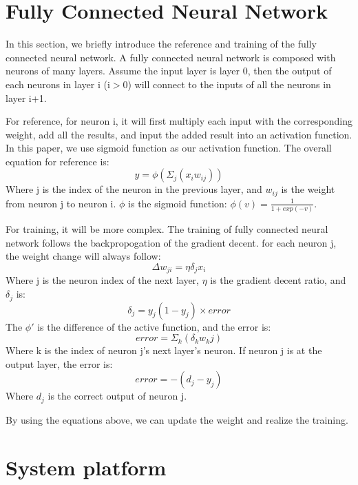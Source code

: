 \documentclass[conference]{IEEEtran}
\begin{document}
\section{Fully Connected Neural Network}
\label{sec:nn}
In this section, we briefly introduce the reference and training of the fully connected neural network. A fully connected neural network is composed with neurons of many layers. Assume the input layer is layer 0, then the output of each neurons in layer i (i$>$0) will connect to the inputs of all the neurons in layer i+1. 

For reference, for neuron i, it will first multiply each input with the corresponding weight, add all the results, and input the added result into an activation function. In this paper, we use sigmoid function as our activation function. The overall equation for reference is: 
\begin{equation}
y=\phi(\Sigma_{j}(x_i w_{ij}))
\end{equation}
Where j is the index of the neuron in the previous layer, and $w_{ij}$ is the weight from neuron j to neuron i. $\phi$ is the sigmoid function: $\phi(v)=\frac{1}{1+exp(-v)}$.

For training, it will be more complex. The training of fully connected neural network follows the backpropogation of the gradient decent. for each neuron j, the weight change will always follow:
\begin{equation}
\Delta w_{ji}=\eta \delta _j x_i
\end{equation}
Where j is the neuron index of the next layer, $\eta$ is the gradient decent ratio, and $\delta _j$ is:
\begin{equation}
\delta _j= y_j(1-y_j) \times error
\label{equ:delta}
\end{equation}
The $\phi \prime$ is the difference of the active function, and the error is:
\begin{equation}
error=\Sigma_{k}(\delta _k w_k j)
\end{equation}
Where k is the index of neuron j's next layer's neuron. If neuron j is at the output layer, the error is:
\begin{equation}
error=-(d_j-y_j)
\end{equation}
Where $d_j$ is the correct output of neuron j.

By using the equations above, we can update the weight and realize the training.

\section{System platform}
\label{sec:sys}
\end{document}
